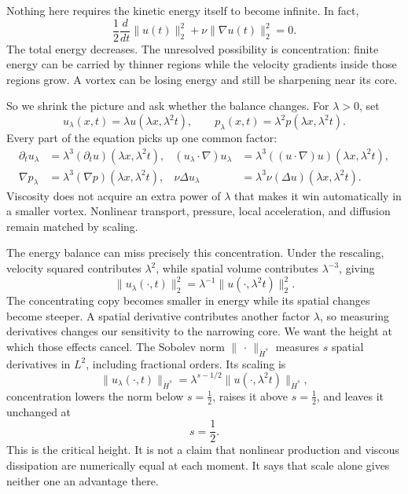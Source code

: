 Nothing here requires the kinetic energy itself to become infinite.  In fact,
\[
\frac12\frac{d}{dt}\|u(t)\|_2^2
+\nu\|\nabla u(t)\|_2^2=0.
\]
The total energy decreases.  The unresolved possibility is concentration:
finite energy can be carried by thinner regions while the velocity gradients
inside those regions grow.  A vortex can be losing energy and still be
sharpening near its core.

So we shrink the picture and ask whether the balance changes.  For
\(\lambda>0\), set
\[
u_\lambda(x,t)=\lambda u(\lambda x,\lambda^2t),
\qquad
p_\lambda(x,t)=\lambda^2p(\lambda x,\lambda^2t).
\]
Every part of the equation picks up one common factor:
\[
\begin{aligned}
\partial_tu_\lambda
  &=\lambda^3(\partial_tu)(\lambda x,\lambda^2t),
&
(u_\lambda\!\cdot\nabla)u_\lambda
  &=\lambda^3((u\!\cdot\nabla)u)(\lambda x,\lambda^2t),\\
\nabla p_\lambda
  &=\lambda^3(\nabla p)(\lambda x,\lambda^2t),
&
\nu\Delta u_\lambda
  &=\lambda^3\nu(\Delta u)(\lambda x,\lambda^2t).
\end{aligned}
\]
Viscosity does not acquire an extra power of \(\lambda\) that makes it win
automatically in a smaller vortex.  Nonlinear transport, pressure, local
acceleration, and diffusion remain matched by scaling.

The energy balance can miss precisely this concentration.  Under the rescaling,
velocity squared contributes \(\lambda^2\), while spatial volume contributes
\(\lambda^{-3}\), giving
\[
\|u_\lambda(\cdot,t)\|_2^2
=\lambda^{-1}\|u(\cdot,\lambda^2t)\|_2^2.
\]
The concentrating copy becomes smaller in energy while its spatial changes
become steeper.  A spatial derivative contributes another factor
\(\lambda\), so measuring derivatives changes our sensitivity to the narrowing
core.  We want the height at which those effects cancel.  The Sobolev norm
\(\|\,\cdot\,\|_{\dot H^s}\) measures \(s\) spatial derivatives in \(L^2\),
including fractional orders.  Its scaling is
\[
\|u_\lambda(\cdot,t)\|_{\dot H^s}
=\lambda^{s-1/2}\|u(\cdot,\lambda^2t)\|_{\dot H^s},
\]
concentration lowers the norm below \(s=\tfrac12\), raises it above
\(s=\tfrac12\), and leaves it unchanged at
\[
s=\frac12.
\]
This is the critical height.  It is not a claim that nonlinear production and
viscous dissipation are numerically equal at each moment.  It says that scale
alone gives neither one an advantage there.

